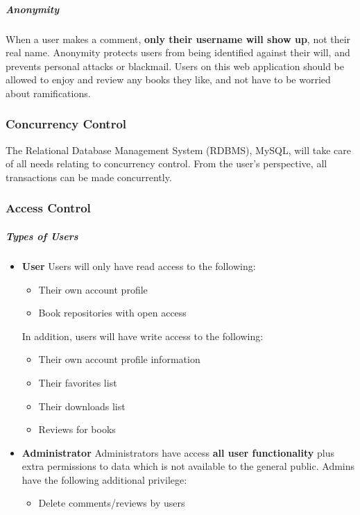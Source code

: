 \documentclass[letter, 12pt, titlepage]{article}
\begin{document}
\subparagraph{Anonymity}
When a user makes a comment, \textbf{only their username will show up}, not their real name. Anonymity protects users from being identified against their will, and prevents personal attacks or blackmail. Users on this web application should be allowed to enjoy and review any books they like, and not have to be worried about ramifications.

\subsubsection{Concurrency Control}
The Relational Database Management System (RDBMS), MySQL, will take care of all needs relating to concurrency control. From the user's perspective, all transactions can be made concurrently.

\subsubsection{Access Control}

\subparagraph{Types of Users}
\begin{itemize}
	\item \textbf{User}
	      Users will only have read access to the following:
	      \begin{itemize}
		      \item  Their own account profile
		      \item  Book repositories with open access
	      \end{itemize}


	      In addition, users will have write access to the following:
	      \begin{itemize}
		      \item  Their own account profile information
		      \item  Their favorites list
		      \item  Their downloads list
		      \item  Reviews for books
	      \end{itemize}

	\item \textbf{Administrator}
	      Administrators have access \textbf{all user functionality} plus extra permissions to data which is not available to the general public. Admins have the following additional privilege:
	      \begin{itemize}
		      \item Delete comments/reviews by users
	      \end{itemize}
\end{itemize}
\end{document}
